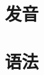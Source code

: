 \documentclass[6pt]{ctexbook}
\begin{document}

\frontmatter{}
\tableofcontents{}
\mainmatter{}




% 

\part{发音}






\part{语法}















\backmatter{}
\end{document}
